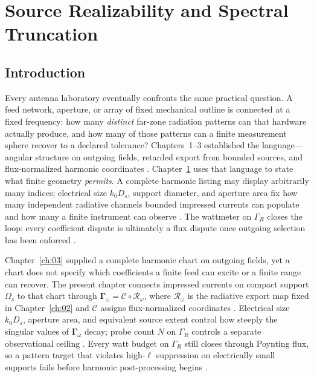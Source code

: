 
\chapter{Source Realizability and Spectral Truncation}
\label{ch:04}
\setcounter{section}{-1}

\section{Introduction}
\label{sec:ch40}

Every antenna laboratory eventually confronts the same practical question. A feed network, aperture, or array of fixed mechanical outline is connected at a fixed frequency: how many \emph{distinct} far-zone radiation patterns can that hardware actually produce, and how many of those patterns can a finite measurement sphere recover to a declared tolerance? Chapters~1--3 established the language---angular structure on outgoing fields, retarded export from bounded sources, and flux-normalized harmonic coordinates \cite{maxwell1873}. Chapter~\ref{ch:04} uses that language to state what finite geometry \emph{permits}. A complete harmonic listing may display arbitrarily many indices; electrical size $k_{0}D_{s}$, support diameter, and aperture area fix how many independent radiative channels bounded impressed currents can populate and how many a finite instrument can observe \cite{chu1948}. The wattmeter on $\Gamma_R$ closes the loop: every coefficient dispute is ultimately a flux dispute once outgoing selection has been enforced \cite{poynting1884}.

Chapter~\ref{ch:03} supplied a complete harmonic chart on outgoing fields, yet a chart does not specify which
coefficients a finite feed can excite or a finite range can recover.
The present chapter connects impressed currents on compact support $\Omega_s$ to that chart through
$\boldsymbol{\Gamma}_\omega=\mathcal{C}\circ\mathcal{R}_\omega$, where $\mathcal{R}_\omega$ is the radiative export map
fixed in Chapter~\ref{ch:02} and $\mathcal{C}$ assigns flux-normalized coordinates
\cite{stratton1941,hansen1988}.
Electrical size $k_0 D_s$, aperture area, and equivalent source extent control how steeply the singular values of
$\boldsymbol{\Gamma}_\omega$ decay; probe count $N$ on $\Gamma_R$ controls a separate observational ceiling
\cite{chu1948,harrington2001}.
Every watt budget on $\Gamma_R$ still closes through Poynting flux, so a pattern target that violates high-$\ell$
suppression on electrically small supports fails before harmonic post-processing begins \cite{poynting1884,stratton1941}.

